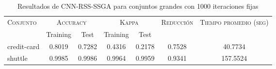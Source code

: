 \begin{table}[]
\centering
\begin{tabular}{l c c c c c c}
\hline
\multirow{2}{*}{\textsc{Conjunto}}
	& \multicolumn{2}{c}{\textsc{Accuracy}}
	& \multicolumn{2}{c}{\textsc{Kappa}}
	& \textsc{Reducción}
	& \textsc{Tiempo promedio (seg)} \\
	& Training & Test
	& Training & Test \\ 
\hline
\hline

credit-card & 0.8019 & 0.7282 & 0.4316 & 0.2178 & 0.7528 & 40.7734 \\
shuttle & 0.9985 & 0.9986 & 0.9964 & 0.9959 & 0.9341 & 157.5524 \\

\hline
\end{tabular}
\caption{Resultados de CNN-RSS-SSGA para conjuntos grandes con 1000 iteraciones fijas}
\label{res-grande-CNN-RSS-ssga}
\end{table}

